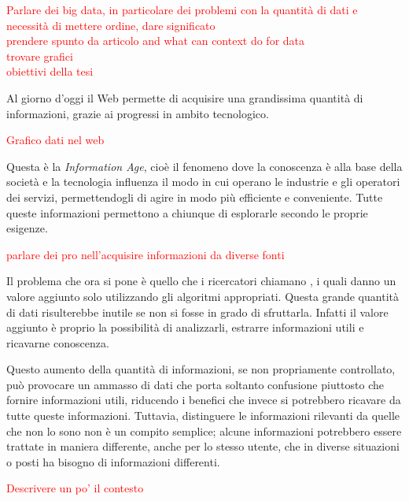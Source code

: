\inputminted{json}{2-nozioni-preliminari/Codice/esempio_risposta_connessione_graphql.json}

\textcolor{red}{Parlare dei big data, in particolare dei problemi con la quantità di dati e necessità di mettere ordine, dare significato\\
	prendere spunto da articolo and what can context do for data\\
	trovare grafici\\
	obiettivi della tesi}

Al giorno d'oggi il Web permette di acquisire una grandissima quantità di informazioni, grazie ai progressi in ambito tecnologico. 

\textcolor{red}{Grafico dati nel web} 

Questa è la \emph{Information Age}, cioè il fenomeno dove la conoscenza è alla base della società e la tecnologia influenza il modo in cui operano le industrie e gli operatori dei servizi, permettendogli di agire in modo più efficiente e conveniente. Tutte queste informazioni permettono a chiunque di esplorarle secondo le proprie esigenze. 

\textcolor{red}{parlare dei pro nell'acquisire informazioni da diverse fonti}

Il problema che ora si pone è quello che i ricercatori chiamano , i quali danno un valore aggiunto solo utilizzando gli algoritmi appropriati. Questa grande quantità di dati risulterebbe inutile se non si fosse in grado di sfruttarla. Infatti il valore aggiunto è proprio la possibilità di analizzarli, estrarre informazioni utili e ricavarne conoscenza. 

Questo aumento della quantità di informazioni, se non propriamente controllato, può provocare un ammasso di dati che porta soltanto confusione piuttosto che fornire informazioni utili, riducendo i benefici che invece si potrebbero ricavare da tutte queste informazioni. Tuttavia, distinguere le informazioni rilevanti da quelle che non lo sono non è un compito semplice; alcune informazioni potrebbero essere trattate in maniera differente, anche per lo stesso utente, che in diverse situazioni o posti ha bisogno di informazioni differenti. 

\textcolor{red}{Descrivere un po' il contesto}


